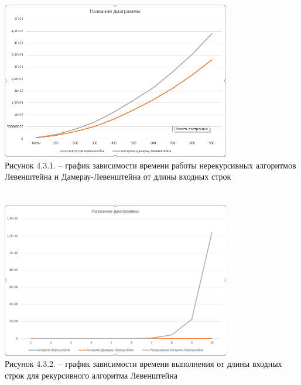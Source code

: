 \documentclass{article}
\begin{document}
\newpage
\small 
	\includegraphics[width=10cm]{gr1}\\
	Рисунок 4.3.1. – график зависимости времени работы нерекурсивных алгоритмов Левенштейна и Дамерау-Левенштейна от длины входных строк 
\normalsize
\\
\\
\\
\small 
	\includegraphics[width=10cm]{gr2}\\
	Рисунок 4.3.2. – график зависимости времени выполнения от длины входных строк для рекурсивного алгоритма Левенштейна 
\normalsize
\\\\
\end{document}
